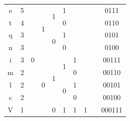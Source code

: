 \documentclass[a4paper,14pt]{extarticle}
\begin{document}
\begin{center}
\begin{tabular}{|c|c|c|c|c|c|c|c|c|c|}
        \cline{1-2} \cline{3-10}
        e                       & 5                            & \multirow{17}{*}{0}         & \multirow{4}{*}{1}   & \multirow{2}{*}{1} & 1                  &                    &                    &     & 0111    \\
        \cline{1-2} \cline{6-10}
        t                       & 4                            &                             &                      &                    & 0                  &                    &                    &     & 0110    \\
        \cline{1-2} \cline{5-10}
        q                       & 3                            &                             &                      & \multirow{2}{*}{0} & 1                  &                    &                    &     & 0101    \\
        \cline{1-2} \cline{6-10}
        n                       & 3                            &                             &                      &                    & 0                  &                    &                    &     & 0100    \\
        \cline{1-2} \cline{4-10}
        i                       & 3                            &                             & \multirow{13}{*}{0}  & \multirow{4}{*}{1} & \multirow{2}{*}{1} & 1                  &                    &     & 00111   \\
        \cline{1-2} \cline{7-10}
        m                       & 2                            &                             &                      &                    &                    & 0                  &                    &     & 00110   \\
        \cline{1-2} \cline{6-10}
        l                       & 2                            &                             &                      &                    & \multirow{2}{*}{0} & 1                  &                    &     & 00101   \\
        \cline{1-2} \cline{7-10}
        c                       & 2                            &                             &                      &                    &                    & 0                  &                    &     & 00100   \\
        \cline{1-2} \cline{5-10}
        V                       & 1                            &                             &                      & \multirow{9}{*}{0} & \multirow{4}{*}{1} & \multirow{2}{*}{1} & 1                  &     & 000111  \\

\end{tabular}
\end{center}
\end{document}
